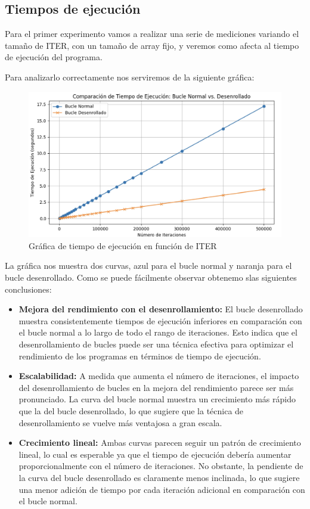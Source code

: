 \documentclass[a4paper,twocolumn]{article}
\begin{document}
\subsection{Tiempos de ejecución}

Para el primer experimento vamos a realizar una serie de mediciones variando el tamaño de ITER, con un tamaño de array fijo, y veremos como afecta al tiempo de ejecución del programa.

Para analizarlo correctamente nos serviremos de la siguiente gráfica:

\begin{figure}[H]
    \centering
    \hspace{1cm}
    \includegraphics[width=\columnwidth]{img/exeTimes.jpg}
    \caption{Gráfica de tiempo de ejecución en función de ITER}
    \label{fig:iter}
\end{figure}

La gráfica nos muestra dos curvas, azul para el bucle normal y naranja para el bucle desenrollado. Como se puede fácilmente observar obtenemo slas siguientes conclusiones:

\begin{itemize}
    \item \textbf{Mejora del rendimiento con el desenrollamiento:} El bucle desenrollado muestra consistentemente tiempos de ejecución inferiores en comparación con el bucle normal a lo largo de todo el rango de iteraciones. Esto indica que el desenrollamiento de bucles puede ser una técnica efectiva para optimizar el rendimiento de los programas en términos de tiempo de ejecución.
    \item \textbf{Escalabilidad:} A medida que aumenta el número de iteraciones, el impacto del desenrollamiento de bucles en la mejora del rendimiento parece ser más pronunciado. La curva del bucle normal muestra un crecimiento más rápido que la del bucle desenrollado, lo que sugiere que la técnica de desenrollamiento se vuelve más ventajosa a gran escala.
    \item \textbf{Crecimiento lineal:} Ambas curvas parecen seguir un patrón de crecimiento lineal, lo cual es esperable ya que el tiempo de ejecución debería aumentar proporcionalmente con el número de iteraciones. No obstante, la pendiente de la curva del bucle desenrollado es claramente menos inclinada, lo que sugiere una menor adición de tiempo por cada iteración adicional en comparación con el bucle normal.
\end{itemize}
\end{document}
